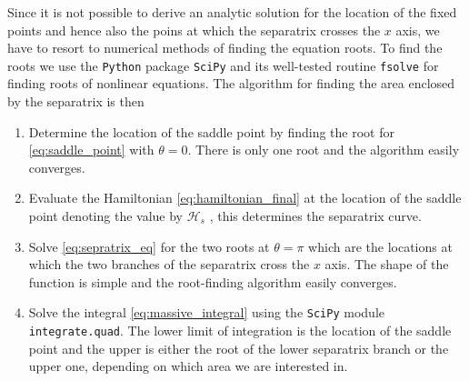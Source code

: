 Since it is not possible to derive an analytic solution for the location
of the fixed points and hence also the poins at which the separatrix
crosses the $x$ axis, we have to resort to numerical methods of finding
the equation roots. To find the roots we use
the \texttt{Python} package \texttt{SciPy} \citep{scipy} and its
well-tested routine \texttt{fsolve} for finding roots of nonlinear equations.
The algorithm for finding the area enclosed by the separatrix is then
\begin{enumerate}
    \item Determine the location of the saddle point by finding the root
        for \cref{eq:saddle_point} with $\theta=0$. There is only one
        root and the algorithm easily converges.\\
    \item Evaluate the Hamiltonian \ref{eq:hamiltonian_final} at the 
        location of the saddle point denoting the value by $\mathcal{H}_s$
        , this determines the separatrix curve.\\
    \item Solve \cref{eq:sepratrix_eq} for the two roots at $\theta=\pi$ 
        which are the locations at which the two branches of the separatrix 
        cross the $x$ axis. The shape of the function is simple and the
        root-finding algorithm easily converges.\\
    \item Solve the integral \ref{eq:massive_integral} using the \texttt{SciPy}
        module \texttt{integrate.quad}. The lower limit of integration is the
        location of the saddle point and the upper is either the root 
        of the lower separatrix branch or the upper one, depending on which
        area we are interested in.
\end{enumerate}

